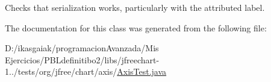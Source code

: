 Checks that serialization works, particularly with the attributed label. 

The documentation for this class was generated from the following file\+:\begin{DoxyCompactItemize}
\item 
D\+:/ikasgaiak/programacion\+Avanzada/\+Mis Ejercicios/\+P\+B\+Ldefinitibo2/libs/jfreechart-\/1../tests/org/jfree/chart/axis/\mbox{\hyperlink{_axis_test_8java}{Axis\+Test.\+java}}\end{DoxyCompactItemize}

